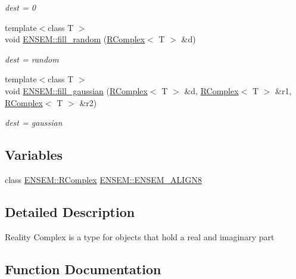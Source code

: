 \begin{DoxyCompactItemize}
\begin{DoxyCompactList}\small\item\em dest = 0 \end{DoxyCompactList}\item 
{\footnotesize template$<$class T $>$ }\\void \mbox{\hyperlink{group__rcomplex_ga376839cc33ca36a705bdb22f74bb22d4}{E\+N\+S\+E\+M\+::fill\+\_\+random}} (\mbox{\hyperlink{classENSEM_1_1RComplex}{R\+Complex}}$<$ T $>$ \&d)
\begin{DoxyCompactList}\small\item\em dest = random \end{DoxyCompactList}\item 
{\footnotesize template$<$class T $>$ }\\void \mbox{\hyperlink{group__rcomplex_gaa47b1150a227265f108216052a5029d8}{E\+N\+S\+E\+M\+::fill\+\_\+gaussian}} (\mbox{\hyperlink{classENSEM_1_1RComplex}{R\+Complex}}$<$ T $>$ \&d, \mbox{\hyperlink{classENSEM_1_1RComplex}{R\+Complex}}$<$ T $>$ \&r1, \mbox{\hyperlink{classENSEM_1_1RComplex}{R\+Complex}}$<$ T $>$ \&r2)
\begin{DoxyCompactList}\small\item\em dest = gaussian \end{DoxyCompactList}\end{DoxyCompactItemize}
\subsection*{Variables}
\begin{DoxyCompactItemize}
\item 
class \mbox{\hyperlink{classENSEM_1_1RComplex}{E\+N\+S\+E\+M\+::\+R\+Complex}} \mbox{\hyperlink{group__rcomplex_ga253974755fe5c9f74b16a943e4e26ff5}{E\+N\+S\+E\+M\+::\+E\+N\+S\+E\+M\+\_\+\+A\+L\+I\+G\+N8}}
\end{DoxyCompactItemize}


\subsection{Detailed Description}
Reality Complex is a type for objects that hold a real and imaginary part 

\subsection{Function Documentation}
\mbox{\label{group__rcomplex_ga4cb16a1d0f8f130aeb4daf0967a43c7e}} 
